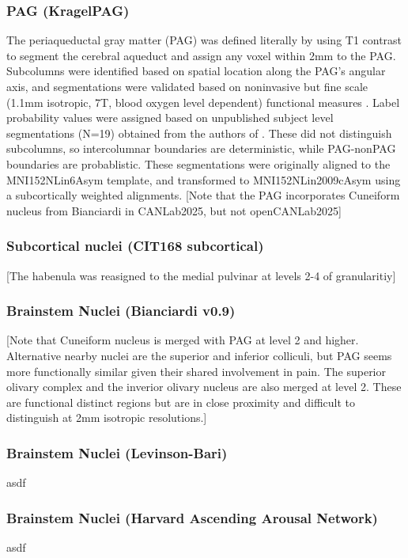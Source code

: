 \documentclass[10pt,letterpaper]{article}
\begin{document}
\subsubsection{PAG (KragelPAG)} The periaqueductal gray matter (PAG) was defined literally by using T1 contrast to segment the cerebral aqueduct and assign any voxel within 2mm to the PAG. Subcolumns were identified based on spatial location along the PAG's angular axis, and segmentations were validated based on noninvasive but fine scale (1.1mm isotropic, 7T, blood oxygen level dependent) functional measures . Label probability values were assigned based on unpublished subject level segmentations (N=19) obtained from the authors of . These did not distinguish subcolumns, so intercolumnar boundaries are deterministic, while PAG-nonPAG boundaries are probablistic. These segmentations were originally aligned to the MNI152NLin6Asym template, and transformed to MNI152NLin2009cAsym using a subcortically weighted alignments. [Note that the PAG incorporates Cuneiform nucleus from Bianciardi in CANLab2025, but not openCANLab2025]
\\
\subsubsection{Subcortical nuclei (CIT168 subcortical)} [The habenula was reasigned to the medial pulvinar at levels 2-4 of granularitiy]
\\
\subsubsection{Brainstem Nuclei (Bianciardi v0.9)} [Note that Cuneiform nucleus is merged with PAG at level 2 and higher. Alternative nearby nuclei are the superior and inferior colliculi, but PAG seems more functionally similar given their shared involvement in pain. The superior olivary complex and the inverior olivary nucleus are also merged at level 2. These are functional distinct regions but are in close proximity and difficult to distinguish at 2mm isotropic resolutions.]
\\
\subsubsection{Brainstem Nuclei (Levinson-Bari)} asdf
\\
\subsubsection{Brainstem Nuclei (Harvard Ascending Arousal Network)} asdf
\\
\end{document}

